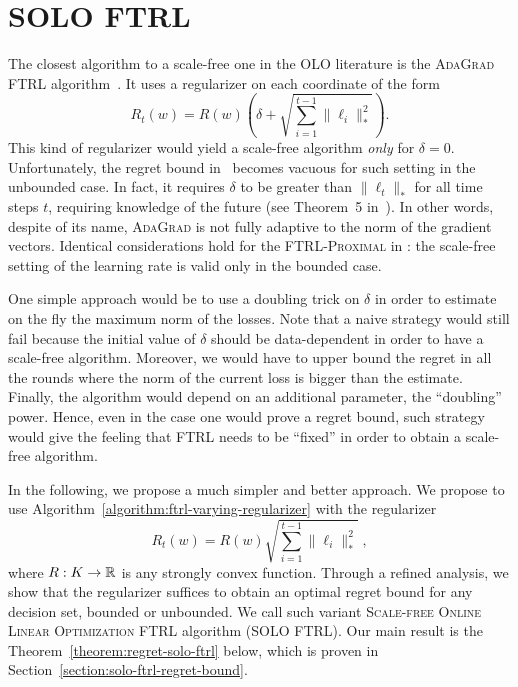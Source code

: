\section{\textsc{SOLO FTRL}}
\label{section:solo-ftrl}

The closest algorithm to a scale-free one in the OLO literature is the
\textsc{AdaGrad FTRL} algorithm~\cite{Duchi-Hazan-Singer-2011}.  It uses a
regularizer on each coordinate of the form
\begin{equation*}
R_t(w) = R(w) \left(\delta + \sqrt{\sum_{i=1}^{t-1} \|\ell_i\|_*^2} \right).
\end{equation*}
This kind of regularizer would yield a scale-free algorithm \emph{only} for
$\delta=0$.  Unfortunately, the regret bound in~\cite{Duchi-Hazan-Singer-2011}
becomes vacuous for such setting in the unbounded case. In fact, it requires
$\delta$ to be greater than $\|\ell_t\|_*$ for all time steps $t$, requiring
knowledge of the future (see Theorem~5 in~\cite{Duchi-Hazan-Singer-2011}). In
other words, despite of its name, \textsc{AdaGrad} is not fully adaptive to the
norm of the gradient vectors. Identical considerations hold for the
\textsc{FTRL-Proximal} in \cite{McMahan-Streeter-2010,McMahan-2014}: the
scale-free setting of the learning rate is valid only in the bounded case.

One simple approach would be to use a doubling trick on $\delta$ in order to
estimate on the fly the maximum norm of the losses. Note that a naive strategy
would still fail because the initial value of $\delta$ should be data-dependent
in order to have a scale-free algorithm. Moreover, we would have to upper bound
the regret in all the rounds where the norm of the current loss is bigger than
the estimate. Finally, the algorithm would depend on an additional parameter,
the ``doubling'' power. Hence, even in the case one would prove a regret bound,
such strategy would give the feeling that \textsc{FTRL} needs to be ``fixed''
in order to obtain a scale-free algorithm.

In the following, we propose a much simpler and better approach.  We propose to
use Algorithm~\ref{algorithm:ftrl-varying-regularizer} with the regularizer
\begin{equation*}
\label{equation:solo-ftrl-regularizer}
R_t(w) = R(w) \sqrt{\sum_{i=1}^{t-1} \|\ell_i\|_*^2} \; ,
\end{equation*}
where $R:K \to \mathbb{R}$ is any strongly convex function. Through a refined analysis,
we show that the regularizer suffices to obtain an optimal regret bound for any
decision set, bounded or unbounded.  We call such variant \textsc{Scale-free
Online Linear Optimization FTRL} algorithm (\textsc{SOLO FTRL}).  Our main
result is the Theorem~\ref{theorem:regret-solo-ftrl} below, which is proven in
Section~\ref{section:solo-ftrl-regret-bound}.

